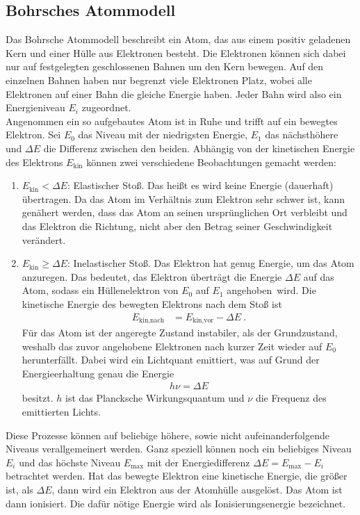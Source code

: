 \subsection{Bohrsches Atommodell}
Das Bohrsche Atommodell beschreibt ein Atom, das aus einem positiv geladenen Kern und einer Hülle aus Elektronen besteht. Die Elektronen können sich dabei nur auf festgelegten geschlossenen Bahnen um den Kern bewegen. Auf den einzelnen Bahnen haben nur begrenzt viele Elektronen Platz, wobei alle Elektronen auf einer Bahn die gleiche Energie haben. Jeder Bahn wird also ein Energieniveau $E_i$ zugeordnet. \cite[Kap. 14.1.1]{Walcher}\\
Angenommen ein so aufgebautes Atom ist in Ruhe und trifft auf ein bewegtes Elektron. Sei $E_0$ das Niveau mit der niedrigsten Energie, $E_1$ das nächsthöhere und $\Delta E$ die Differenz zwischen den beiden. Abhängig von der kinetischen Energie des Elektrons $E_\text{kin}$ können zwei verschiedene Beobachtungen gemacht werden:
\begin{enumerate}
	\item $E_\text{kin}<\Delta E$: Elastischer Stoß. Das heißt es wird keine Energie (dauerhaft) übertragen. Da das Atom im Verhältnis zum Elektron sehr schwer ist, kann genähert werden, dass das Atom an seinen ursprünglichen Ort verbleibt und das Elektron die Richtung, nicht aber den Betrag seiner Geschwindigkeit verändert.
	\item $E_\text{kin}\geq\Delta E$: Inelastischer Stoß. Das Elektron hat genug Energie, um das Atom anzuregen. Das bedeutet, das Elektron überträgt die Energie $\Delta E$ auf das Atom, sodass ein Hüllenelektron von $E_0$ auf $E_1$ \grqq angehoben\grqq\ wird. Die kinetische Energie des bewegten Elektrons nach dem Stoß ist
	\begin{align}
		E_\text{kin,nach} &= E_\text{kin,vor} - \Delta E \ .
	\end{align}
	Für das Atom ist der angeregte Zustand instabiler, als der Grundzustand, weshalb das zuvor angehobene Elektronen nach kurzer Zeit wieder auf $E_0$ \grqq herunterfällt\grqq. Dabei wird ein Lichtquant emittiert, was auf Grund der Energieerhaltung genau die Energie
	\begin{align}\label{eq:energie1}
		h\nu = \Delta E
	\end{align}
	besitzt. $h$ ist das Plancksche Wirkungsquantum und $\nu$ die Frequenz des emittierten Lichts.
\end{enumerate}
Diese Prozesse können auf beliebige höhere, sowie nicht aufeinanderfolgende Niveaus verallgemeinert werden. Ganz speziell können noch ein beliebiges Niveau $E_i$ und das höchste Niveau $E_\text{max}$ mit der Energiedifferenz $\Delta E = E_\text{max}-E_i$ betrachtet werden. Hat das bewegte Elektron eine kinetische Energie, die größer ist, als $\Delta E$, dann wird ein Elektron aus der Atomhülle ausgelöst. Das Atom ist dann ionisiert. Die dafür nötige Energie wird als Ionisierungsenergie bezeichnet.
\clearpage

